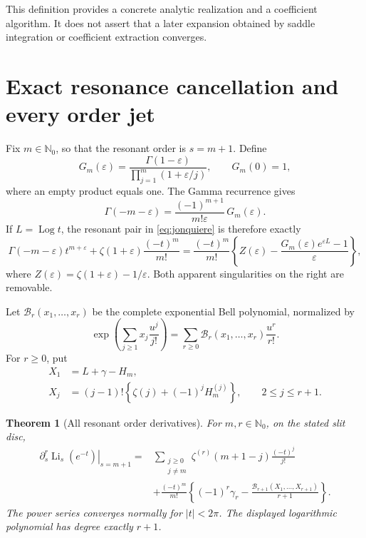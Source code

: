\documentclass[11pt,a4paper]{article}
\numberwithin{equation}{section}
\newtheorem{theorem}{Theorem}[section]
\theoremstyle{definition}
\theoremstyle{remark}
\DeclareMathOperator{\Li}{Li}
\DeclareMathOperator{\Log}{Log}
\newcommand{\Nzero}{\mathbb N_0}
\newcommand{\eps}{\varepsilon}
\begin{document}
This definition provides a concrete analytic realization and a
coefficient algorithm.  It does not assert that a later expansion
obtained by saddle integration or coefficient extraction converges.

\section{Exact resonance cancellation and every order jet}
\label{sec:jets}

Fix \(m\in\Nzero\), so that the resonant order is \(s=m+1\).  Define
\begin{equation}
 G_m(\eps)=
 \frac{\Gamma(1-\eps)}
      {\prod_{j=1}^m(1+\eps/j)},\qquad G_m(0)=1,
 \label{eq:Gm}
\end{equation}
where an empty product equals one.  The Gamma recurrence gives
\[
 \Gamma(-m-\eps)
 =\frac{(-1)^{m+1}}{m!\eps}\,G_m(\eps).
\]
If \(L=\Log t\), the resonant pair in
\eqref{eq:jonquiere} is therefore exactly
\begin{equation}
 \Gamma(-m-\eps)t^{m+\eps}
 +\zeta(1+\eps)\frac{(-t)^m}{m!}
 =
 \frac{(-t)^m}{m!}
 \left\{Z(\eps)-\frac{G_m(\eps)e^{\eps L}-1}{\eps}\right\},
 \label{eq:respair}
\end{equation}
where \(Z(\eps)=\zeta(1+\eps)-1/\eps\).
Both apparent singularities on the right are removable.

Let \(\mathcal B_r(x_1,\ldots,x_r)\) be the complete exponential Bell
polynomial, normalized by
\begin{equation}
 \exp\left(\sum_{j\ge1}x_j\frac{u^j}{j!}\right)
 =\sum_{r\ge0}\mathcal B_r(x_1,\ldots,x_r)\frac{u^r}{r!}.
 \label{eq:bell}
\end{equation}
For \(r\ge0\), put
\begin{align}
 X_1&=L+\gamma-H_m, \nonumber\\
 X_j&=(j-1)!\left\{\zeta(j)+(-1)^jH_m^{(j)}\right\},
 \qquad 2\le j\le r+1.
 \label{eq:X}
\end{align}

\begin{theorem}[All resonant order derivatives]
\label{thm:jets}
For \(m,r\in\Nzero\), on the stated slit disc,
\begin{align}
 \left.\partial_s^r\Li_s(e^{-t})\right|_{s=m+1}
 ={}&
 \sum_{\substack{j\ge0\\j\ne m}}
   \zeta^{(r)}(m+1-j)\frac{(-t)^j}{j!}
 \nonumber\\
 &+\frac{(-t)^m}{m!}
 \left\{(-1)^r\gamma_r-
 \frac{\mathcal B_{r+1}(X_1,\ldots,X_{r+1})}{r+1}\right\}.
 \label{eq:alljets}
\end{align}
The power series converges normally for \(|t|<2\pi\).
The displayed logarithmic polynomial has degree exactly \(r+1\).
\end{theorem}
\end{document}
